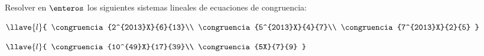 \begin{enunciado}{\ejercicio}
  Resolver en $\enteros$ los siguientes sistemas lineales
  de ecuaciones de congruencia:
  \begin{enumerate}[label=\roman*)]
    \begin{multicols}{2}
      \item
      $
        \llave{l}{
          \congruencia{2^{2013}X}{6}{13}\\
          \congruencia{5^{2013}X}{4}{7}\\
          \congruencia{7^{2013}X}{2}{5}
        }
      $
      \item
      $
        \llave{l}{
          \congruencia{10^{49}X}{17}{39}\\
          \congruencia{5X}{7}{9}
        }
      $
    \end{multicols}
  \end{enumerate}
\end{enunciado}

